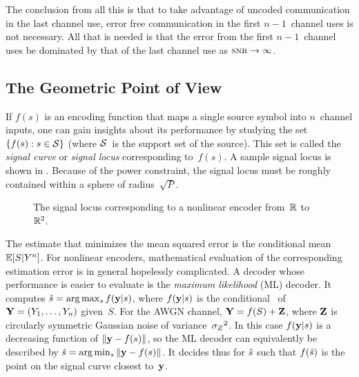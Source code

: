 The conclusion from all this is that to take advantage of uncoded communication
in the last channel use, error free communication in the first $n-1$~channel
uses is not necessary. All that is needed is that the error from the first
$n-1$~channel uses be dominated by that of the last channel use as $\snr \goesto
\infty$. 


\subsection{The Geometric Point of View}\label{sec:geomviewpoint}

If $f(s)$ is an encoding function that maps a single source symbol into
$n$~channel inputs, one can gain insights about its performance by studying the
set $\{f(s): s \in \mathcal{S}\}$ (where $\mathcal{S}$~is the support set of the source). This
set is called the \emph{signal curve} or \emph{signal locus} corresponding
to~$f(s)$. A sample signal locus is shown in . Because of
the power constraint, the signal locus must be roughly contained within a sphere
of radius~$\sqrt{P}$.

\begin{figure}
  \begin{center}
    
  \end{center}
  \caption{The signal locus corresponding to a nonlinear encoder from~$\mathbb{R}$
  to~$\mathbb{R}^2$.}
  \label{fig:nonlinlocus}
\end{figure}

The estimate that minimizes the mean squared error is the conditional mean $\mathbb{E}[S
| Y^n]$. For nonlinear encoders, mathematical evaluation of the corresponding
estimation error is in general hopelessly complicated. A decoder whose
performance is easier to evaluate is the \emph{maximum likelihood} (ML) decoder.
It computes ${\hat{s}} = \arg\max_{s} f(\mathbf{y}|s)$, where $f(\mathbf{y}|s)$ is the conditional
\pdf\ of~$\mathbf{Y} = (Y_1, \dots, Y_n)$ given~$S$. For the AWGN channel, $\mathbf{Y} = f(S) +
\mathbf{Z}$, where $\mathbf{Z}$ is circularly symmetric Gaussian noise of variance~${{\sigma_Z}^2}$. In
this case $f(\mathbf{y}|s)$ is a decreasing function of $\|\mathbf{y} - f(s)\|$, so the ML
decoder can equivalently be described by ${\hat{s}} = \arg\min_{s} \|\mathbf{y} - f(s)\|$. It
decides thus for ${\hat{s}}$ such that $f({\hat{s}})$ is the point on the signal curve
closest to~$\mathbf{y}$. 

